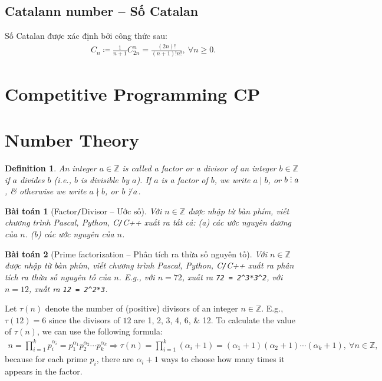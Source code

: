 \documentclass{article}
\newtheorem{baitoan}{Bài toán}
\newtheorem{definition}{Definition}
\DeclareRobustCommand{\divby}{%
	\mathrel{\vbox{\baselineskip.65ex\lineskiplimit0pt\hbox{.}\hbox{.}\hbox{.}}}%
}
\begin{document}
\subsection{Catalann number -- Số Catalan}
Số Catalan được xác định bởi công thức sau:
\begin{align*}
	C_n\coloneqq\frac{1}{n + 1}C_{2n}^n = \frac{(2n)!}{(n + 1)!n!},\ \forall n\ge0.
\end{align*}


\section{Competitive Programming CP}


\section{Number Theory}

\begin{definition}
	An integer $a\in\mathbb{Z}$ is called a \emph{factor} or a \emph{divisor} of an integer $b\in\mathbb{Z}$ if $a$ divides $b$ (i.e., $b$ is divisible by $a$). If $a$ is a factor of $b$, we write $a\mid b$, or $b\divby a$, \& otherwise we write $a\nmid b$, or $b\not\,\divby a$.
\end{definition}

\begin{baitoan}[Factor\texttt{/}Divisor -- Ước số]
	Với $n\in\mathbb{Z}$ được nhập từ bàn phím, viết chương trình {\sf Pascal, Python, C\texttt{/}C++} xuất ra tất cả: (a) các ước nguyên dương của $n$. (b) các ước nguyên của $n$.
\end{baitoan}

\begin{baitoan}[Prime factorization -- Phân tích ra thừa số nguyên tố]
	Với $n\in\mathbb{Z}$ được nhập từ bàn phím, viết chương trình {\sf Pascal, Python, C\texttt{/}C++} xuất ra phân tích ra thừa số nguyên tố của $n$. E.g., với $n = 72$, xuất ra \verb|72 = 2^3*3^2|, với $n = 12$, xuất ra \verb|12 = 2^2*3|.
\end{baitoan}
Let $\tau(n)$ denote the number of (positive) divisors of an integer $n\in\mathbb{Z}$. E.g., $\tau(12) = 6$ since the divisors of $12$ are 1, 2, 3, 4, 6, \& 12. To calculate the value of $\tau(n)$, we can use the following formula:
\begin{align*}
	n = \prod_{i=1}^k p_i^{\alpha_i} = p_1^{\alpha_1}p_2^{\alpha_2}\cdots p_k^{\alpha_k}\Rightarrow\tau(n) = \prod_{i=1}^k (\alpha_i + 1) = (\alpha_1 + 1)(\alpha_2 + 1)\cdots(\alpha_k + 1),\ \forall n\in\mathbb{Z},
\end{align*}
because for each prime $p_i$, there are $\alpha_i + 1$ ways to choose how many times it appears in the factor.
\end{document}
